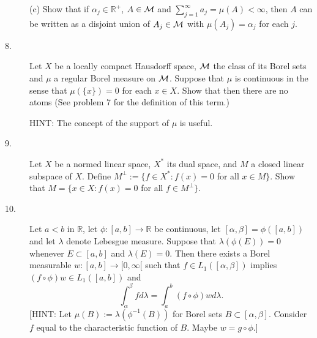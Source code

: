\documentclass{article}
\def\R{\mathbb R}
\begin{document}
\begin{description}
\item[\quad] (c)
Show that if $\alpha_j \in \R^+$, $A \in {\cal M}$ and
$\sum^\infty_{j=1} a_j = \mu (A) < \infty$, then $A$ can be written as a
disjoint union of $A_j \in {\cal M}$ with $\mu(A_j) = \alpha_j$ for each
$j$.

\item[8.]
Let $X$ be a locally compact Hausdorff space, ${\cal M}$ the class of its
Borel sets and $\mu$ a regular Borel measure on ${\cal M}$. Suppose that
$\mu$ is continuous in the sense that $\mu(\{x\}) =0$ for each $x \in X$.
Show that then there are no atoms (See problem 7 for the definition of
this term.)

HINT: The concept of the support of $\mu$ is useful.

\item[9.]
Let $X$ be a normed linear space, $X^\ast$ its dual space, and $M$ a closed
linear subspace of $X$. Define $M^\perp := \{f \in X^\ast : f(x) = 0$ for all
$x \in M\}$. Show that $M=\{x \in X :f(x) =0$ for all $f \in M^\perp\}$.

\item[10.]
Let $a <b$ in $\R$, let $\phi :[a,b] \to \R$ be continuous, let
$[\alpha, \beta] = \phi ([a,b])$ and let $\lambda$ denote Lebesgue measure.
Suppose that $\lambda (\phi(E))=0$ whenever $E \subset[a,b]$ and
$\lambda (E) =0$. Then there exists a Borel measurable
$w:[a,b] \to [0, \infty[$ such that $f \in L_1 ([\alpha, \beta])$ implies
$(f \circ \phi) w \in L_1 ([a,b])$ and
$$\int^\beta_\alpha fd\lambda = \int^b_a (f \circ \phi) wd\lambda.$$
[HINT: Let $\mu (B) := \lambda (\phi^{-1} (B))$ for Borel sets
$B\subset [\alpha, \beta]$. Consider $f$ equal to the characteristic function
of $B$. Maybe $w= g \circ \phi$.]






\end{description}    
\end{document}
